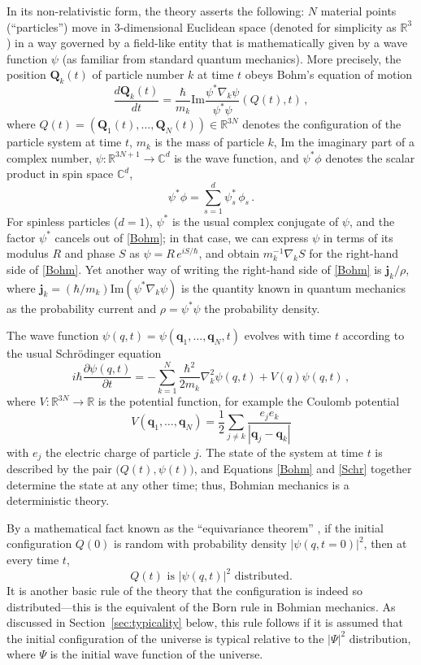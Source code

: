\documentclass[12pt]{article}
\newcommand{\be}{\begin{equation}}
\newcommand{\ee}{\end{equation}}
\renewcommand{\Im}{\mathrm{Im}}
\newcommand{\RRR}{\mathbb{R}}
\newcommand{\CCC}{\mathbb{C}}
\newcommand{\vQ}{\boldsymbol{Q}}
\newcommand{\vj}{\boldsymbol{j}}
\newcommand{\vq}{\boldsymbol{q}}
\begin{document}
In its non-relativistic form, the theory asserts the following: $N$ material points (``particles'') move in 3-dimensional Euclidean space (denoted for simplicity as $\RRR^3$) in a way governed by a field-like entity that is mathematically given by a wave function $\psi$ (as familiar from standard quantum mechanics). More precisely,
the position $\vQ_k(t)$ of particle number $k$ at time $t$ obeys Bohm's equation of motion
\be\label{Bohm}
\frac{d\vQ_k(t)}{dt} = \frac{\hbar}{m_k} \Im \frac{\psi^*\nabla_k \psi}{\psi^*\psi}(Q(t),t)\,,
\ee
where $Q(t)=(\vQ_1(t),\ldots,\vQ_N(t))\in\RRR^{3N}$ denotes the configuration of the particle system at time $t$, $m_k$ is the mass of particle $k$, Im the imaginary part of a complex number, $\psi:\RRR^{3N+1}\to \CCC^d$ is the wave function, and $\psi^*\phi$ denotes the scalar product in spin space $\CCC^d$,
\be
\psi^*\phi = \sum_{s=1}^d \psi_s^* \, \phi_s\,.
\ee
For spinless particles ($d=1$), $\psi^*$ is the usual complex conjugate of $\psi$, and the factor $\psi^*$ cancels out of \eqref{Bohm}; in that case, we can express $\psi$ in terms of its modulus $R$ and phase $S$ as $\psi=R\,e^{iS/\hbar}$, and obtain $m_k^{-1}\nabla_k S$ for the right-hand side of \eqref{Bohm}. Yet another way of writing the right-hand side of \eqref{Bohm} is $\vj_k/\rho$, where $\vj_k=(\hbar/m_k) \Im (\psi^*\nabla_k \psi)$ is the quantity known in quantum mechanics as the probability current and $\rho=\psi^*\psi$ the probability density.

The wave function $\psi(q,t)=\psi(\vq_1,\ldots,\vq_N,t)$ evolves with time $t$ according to the usual Schr\"odinger equation
\be\label{Schr}
i\hbar \frac{\partial \psi(q,t)}{\partial t} = -\sum_{k=1}^N \frac{\hbar^2}{2m_k} \nabla_k^2 \psi(q,t) + V(q) \psi(q,t)\,,
\ee
where $V:\RRR^{3N}\to \RRR$ is the potential function, for example the Coulomb potential
\be
V(\vq_1,\ldots,\vq_N) = \frac{1}{2} \sum_{j\neq k} \frac{e_j e_k}{|\vq_j-\vq_k|}
\ee
with $e_j$ the electric charge of particle $j$. The state of the system at time $t$ is described by the pair $\bigl(Q(t),\psi(t)\bigr)$, and Equations \eqref{Bohm} and \eqref{Schr} together determine the state at any other time; thus, Bohmian mechanics is a deterministic theory.

By a mathematical fact known as the ``equivariance theorem'' \cite{Bohm52,DGZ92}, if the initial configuration $Q(0)$ is random with probability density $|\psi(q,t=0)|^2$, then at every time $t$,
\be\label{Born}
Q(t)\text{ is }|\psi(q,t)|^2\text{ distributed}.
\ee
It is another basic rule of the theory that the configuration is indeed so distributed---this is the equivalent of the Born rule in Bohmian mechanics. As discussed in Section~\ref{sec:typicality} below, this rule follows if it is assumed that the initial configuration of the universe is typical relative to the $|\Psi|^2$ distribution, where $\Psi$ is the initial wave function of the universe.
\end{document}
